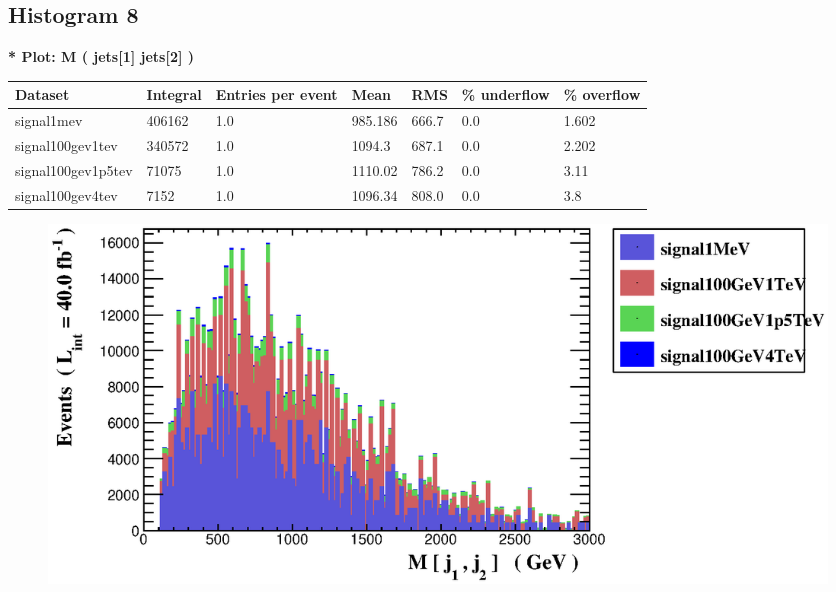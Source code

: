 \documentclass[a4paper, 10pt]{article}
\begin{document}
\subsection{ Histogram 8}

\textbf{* Plot: M ( jets[1] jets[2] ) }\\
   \begin{table}[H]
  \begin{center}
    \begin{tabular}{|m{23.0mm}|m{23.0mm}|m{18.0mm}|m{19.0mm}|m{19.0mm}|m{19.0mm}|m{19.0mm}|}
      \hline
      {\cellcolor{yellow}         Dataset}& {\cellcolor{yellow}         Integral}& {\cellcolor{yellow}         Entries per event}& {\cellcolor{yellow}         Mean}& {\cellcolor{yellow}         RMS}& {\cellcolor{yellow}         \% underflow}& {\cellcolor{yellow}         \% overflow}\\
      \hline
      {\cellcolor{white}         signal1mev}& {\cellcolor{white}         406162}& {\cellcolor{white}         1.0}& {\cellcolor{white}         985.186}& {\cellcolor{white}         666.7}& {\cellcolor{green}         0.0}& {\cellcolor{green}         1.602}\\
      \hline
      {\cellcolor{white}         signal100gev1tev}& {\cellcolor{white}         340572}& {\cellcolor{white}         1.0}& {\cellcolor{white}         1094.3}& {\cellcolor{white}         687.1}& {\cellcolor{green}         0.0}& {\cellcolor{green}         2.202}\\
      \hline
      {\cellcolor{white}         signal100gev1p5tev}& {\cellcolor{white}         71075}& {\cellcolor{white}         1.0}& {\cellcolor{white}         1110.02}& {\cellcolor{white}         786.2}& {\cellcolor{green}         0.0}& {\cellcolor{green}         3.11}\\
      \hline
      {\cellcolor{white}         signal100gev4tev}& {\cellcolor{white}         7152}& {\cellcolor{white}         1.0}& {\cellcolor{white}         1096.34}& {\cellcolor{white}         808.0}& {\cellcolor{green}         0.0}& {\cellcolor{green}         3.8}\\
\hline
    \end{tabular}
  \end{center}
\end{table}

\begin{figure}[H]
  \begin{center}
    \includegraphics[scale=0.45]{selection_7.eps}\\
\caption{   }
  \end{center}
\end{figure}
      \newpage
\end{document}

